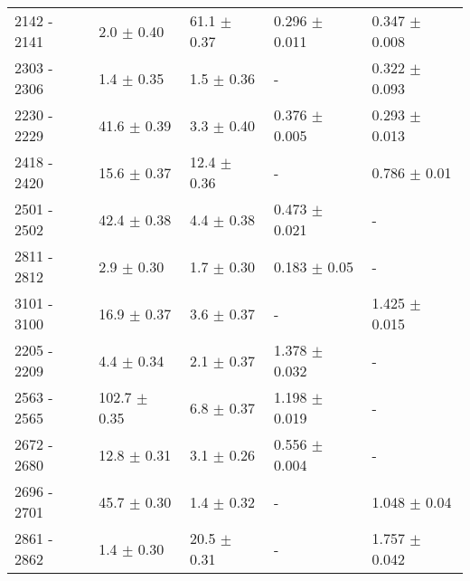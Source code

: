 \begin{table}
\begin{tabular}{l l l l l}
    \\
    2142 - 2141	& 2.0 $\pm$ 0.40 & 61.1 $\pm$ 0.37 & 0.296 $\pm$ 0.011 & 0.347 $\pm$ 0.008 %
    \\
    2303 - 2306	& 1.4 $\pm$ 0.35 & 1.5 $\pm$ 0.36 & - & 0.322 $\pm$ 0.093 %
    \\
    2230 - 2229	& 41.6 $\pm$ 0.39 & 3.3 $\pm$ 0.40 & 0.376 $\pm$ 0.005 & 0.293 $\pm$ 0.013 %
    \\
    2418 - 2420	& 15.6 $\pm$ 0.37 & 12.4 $\pm$ 0.36 & - & 0.786 $\pm$ 0.01 %
    \\
    2501 - 2502	& 42.4 $\pm$ 0.38 & 4.4 $\pm$ 0.38 & 0.473 $\pm$	0.021 & - %
    \\
    2811 - 2812	& 2.9 $\pm$ 0.30 & 1.7 $\pm$ 0.30 & 0.183 $\pm$	0.05 & - %
    \\
    3101 - 3100	& 16.9 $\pm$ 0.37 & 3.6 $\pm$ 0.37 & - & 1.425 $\pm$ 0.015 %
    \\
    2205 - 2209	& 4.4 $\pm$ 0.34 & 2.1 $\pm$ 0.37 & 1.378 $\pm$ 0.032 & - %
    \\
    2563 - 2565	& 102.7 $\pm$ 0.35 & 6.8 $\pm$ 0.37 & 1.198 $\pm$ 0.019 & - %
    \\
    2672 - 2680	& 12.8 $\pm$ 0.31 & 3.1 $\pm$ 0.26 & 0.556 $\pm$ 0.004 & - %
    \\
    2696 - 2701	& 45.7 $\pm$ 0.30 & 1.4 $\pm$ 0.32 & - & 1.048 $\pm$ 0.04 %
    \\
    2861 - 2862 & 1.4 $\pm$ 0.30 & 20.5 $\pm$ 0.31 & - & 1.757 $\pm$ 0.042 %

\end{tabular}
\end{table}
